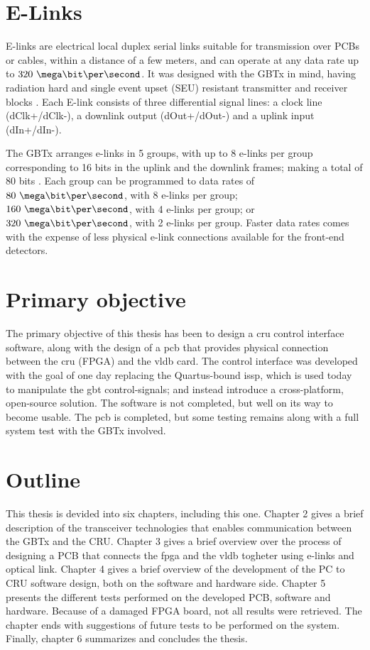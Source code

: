 \documentclass[main.tex]{subfiles}
\begin{document}
\section{E-Links} \label{sec:elinks}
E-links are electrical local duplex  serial links suitable for transmission over PCBs or cables, within a distance of a few meters, and can operate at any data rate up to $320~\mega\bit\per\second$. It was designed with the GBTx in mind, having radiation hard and single event upset (SEU) resistant transmitter and receiver blocks \cite{elinks}. Each E-link consists of three differential signal lines: a clock line (dClk+/dClk-), a downlink output (dOut+/dOut-) and a uplink input (dIn+/dIn-).

The GBTx arranges e-links in 5 groups, with up to 8 e-links per group corresponding to 16 bits in the uplink and the downlink frames; making a total of 80 bits \cite{gbtxman11}. Each group can be programmed to data rates of $80~\mega\bit\per\second$, with 8 e-links per group; $160~\mega\bit\per\second$, with 4 e-links per group; or $320~\mega\bit\per\second$, with 2 e-links per group. Faster data rates comes with the expense of less physical e-link connections available for the front-end detectors.

\section{Primary objective}
The primary objective of this thesis has been to design a \gls{cru} control interface software, along with the design of a \gls{pcb} that provides physical connection between the \gls{cru} (FPGA) and the \gls{vldb} card. The control interface was developed with the goal of one day replacing the Quartus-bound \gls{issp}, which is used today to manipulate the \gls{gbt} control-signals; and instead introduce a cross-platform, open-source solution. The software is not completed, but well on its way to become usable. The \gls{pcb} is completed, but some testing remains along with a full system test with the GBTx involved.

\section{Outline}
This thesis is devided into six chapters, including this one. Chapter 2 gives a brief description of the transceiver technologies that enables communication between the GBTx and the CRU. Chapter 3 gives a brief overview over the process of designing a PCB that connects the \gls{fpga} and the \gls{vldb} togheter using e-links and optical link. Chapter 4 gives a brief overview of the development of the PC to CRU software design, both on the software and hardware side. Chapter 5 presents the different tests performed on the developed PCB, software and hardware. Because of a damaged FPGA board, not all results were retrieved. The chapter ends with suggestions of future tests to be performed on the system. Finally, chapter 6 summarizes and concludes the thesis.
\end{document}

